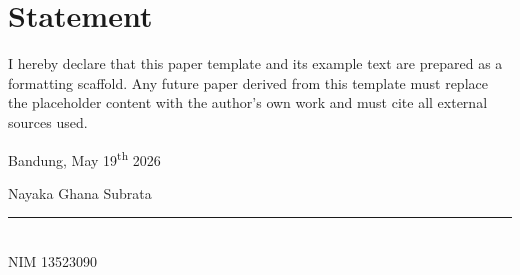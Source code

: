 \section*{Statement}

\newlength{\signaturewidth}
\settowidth{\signaturewidth}{Nayaka Ghana Subrata}

I hereby declare that this paper template and its example text are prepared as a formatting scaffold. Any future paper derived from this template must replace the placeholder content with the author's own work and must cite all external sources used.

\begin{flushright}
Bandung, May 19\textsuperscript{th} 2026

\vspace{2.0em}
Nayaka Ghana Subrata\\
\rule{\signaturewidth}{0.4pt}\\[-0.1em]
NIM 13523090
\end{flushright}
